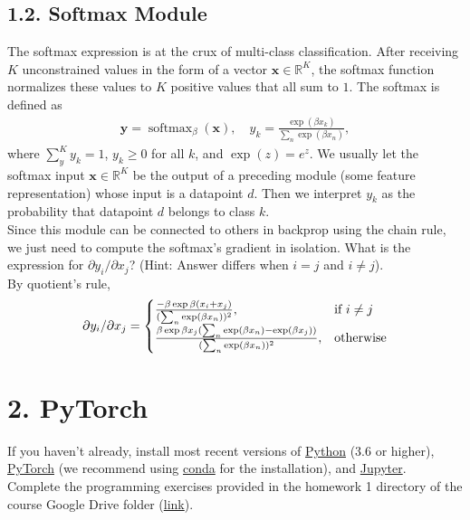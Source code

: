 \documentclass[12pt,letterpaper]{article}
\newcommand{\vect}[1]{\bm{#1}}     %
\DeclareMathOperator{\softmax}{softmax}
\begin{document}
\subsection*{1.2. Softmax Module}
The softmax expression is at the crux of multi-class classification.
After receiving $K$ unconstrained values in the form of a vector $\vect{x} \in \mathbb{R}^K$, the softmax function normalizes these values to $K$ positive values that all sum to $1$. The softmax is defined as
\begin{align}
\vect{y}=\softmax_\beta(\vect{x}),
\quad 
 y_k = \frac{\exp(\beta x_k)}{\sum_{n} \exp(\beta x_{n})},
\end{align}
where $\sum_y^K y_k = 1$, $y_k \geq 0$ for all $k$, and $\exp(z)=e^z$. We usually let the softmax input $\vect{x} \in \mathbb{R}^K$ be the output of a preceding module (some feature representation) whose input is a datapoint $d$. Then we interpret $y_k$ as the probability that datapoint $d$ belongs to class $k$.\\

\noindent Since this module can be connected to others in backprop using the chain rule, we just need to compute the softmax's gradient in isolation. What is the expression for $\partial y_i / \partial x_j$?
(Hint: Answer differs when $i = j$ and $i \neq j$).\\
By quotient's rule, 
$$
\partial y_i / \partial x_j=\begin{cases}
			\frac{- \beta \exp{\beta (x_i + x_j)}}{(\sum_{n} \exp(\beta x_{n}))^2}, & \text{if $ i \neq j$}\\
            \frac{\beta \exp{\beta x_j}(\sum_{n} \exp(\beta x_{n}) - \exp(\beta x_j))}{(\sum_{n} \exp(\beta x_{n}))^2}, & \text{otherwise}
		 \end{cases}
$$
\newpage
\section*{2. PyTorch}
If you haven't already, install most recent versions of 
\href{https://www.python.org/downloads/}{Python} (3.6 or higher), \href{https://pytorch.org/}{PyTorch} (we recommend using \href{https://conda.io/projects/conda/en/latest/user-guide/install/index.html}{conda} for the installation), and \href{https://jupyter.org/install.html}{Jupyter}.\\

\noindent Complete the programming exercises provided in the homework 1 directory of the course Google Drive folder (\href{https://drive.google.com/drive/u/2/folders/1CQ0Jiti5st01OOuSfFljyoe_z-366y4y}{link}).
\end{document}
